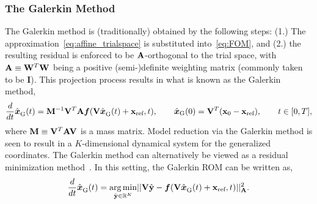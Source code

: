 \documentclass[3p,computermodern,10pt]{elsarticle}
\begin{document}
\subsubsection{The Galerkin Method}
The Galerkin method is (traditionally) obtained by the following steps: (1.) The approximation~\eqref{eq:affine_trialspace} is substituted into~\eqref{eq:FOM}, and (2.) the resulting residual is enforced to be $\stweightingMatArg{}$-orthogonal to the trial space, with $\stweightingMatArg{ } \equiv \stweightingMatOneArg{ }^T \stweightingMatOneArg{ }$ being a positive (semi-)definite weighting matrix (commonly taken to be $\mathbf{I}$). This projection process results in what is known as the Galerkin method,
\begin{equation*}\label{eq:g_truncation2}
\frac{d}{dt}\genstateGalerkinArg{}{t} = \massArgnt{n}^{-1} \basisspace^T \stweightingMatArg{n} \velocity(\basisspace
\genstateGalerkinArg{}{t} + \stateIntercept,t), \qquad \genstateGalerkin(0) = \genstateIC, \qquad t \in [0,T],
\end{equation*}
where $\massArgnt{ } \equiv \basisspace^T \stweightingMatArg{ } \basisspace$ is a mass matrix. 
Model reduction via the Galerkin method is seen to result in a $K$-dimensional dynamical system for the 
generalized coordinates. 
The Galerkin method can alternatively be viewed as a residual minimization method~\cite{carlberg_lspg_v_galerkin}. In this setting, the Galerkin ROM can be 
written as,
$$
\frac{d}{dt}\genstateGalerkinArg{}{t} = \underset{ \genstateyDiscrete \in \RR{\romdim}  }{\text{arg\,min}} || \basisspace \hat{\stateyDiscrete} -  \velocity(\basisspace \genstateGalerkinArg{}{t} + \stateIntercept,t) ||_{\stweightingMatArg{n}}^2. 
$$
\end{document}
